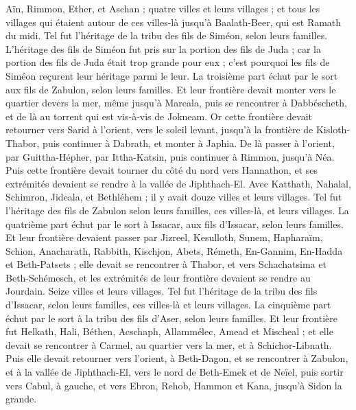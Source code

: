 \begin{multicols}{2}
Aïn, Rimmon, Ether, et Aschan ; quatre villes et leurs villages ;
et tous les villages qui étaient autour de ces villes-là jusqu'à Baalath-Beer, qui est Ramath du midi. Tel fut l'héritage de la tribu des fils de Siméon, selon leurs familles.
L'héritage des fils de Siméon fut pris sur la portion des fils de Juda ; car la portion des fils de Juda était trop grande pour eux ; c'est pourquoi les fils de Siméon reçurent leur héritage parmi le leur.
La troisième part échut par le sort aux fils de Zabulon, selon leurs familles.
Et leur frontière devait monter vers le quartier devers la mer, même jusqu'à Mareala, puis se rencontrer à Dabbéscheth, et de là au torrent qui est vis-à-vis de Jokneam.
Or cette frontière devait retourner vers Sarid à l'orient, vers le soleil levant, jusqu'à la frontière de Kisloth-Thabor, puis continuer à Dabrath, et monter à Japhia.
De là passer à l'orient, par Guittha-Hépher, par Ittha-Katsin, puis continuer à Rimmon, jusqu'à Néa.
Puis cette frontière devait tourner du côté du nord vers Hannathon, et ses extrémités devaient se rendre à la vallée de Jiphthach-El.
Avec Katthath, Nahalal, Schimron, Jideala, et Bethléhem ; il y avait douze villes et leurs villages.
Tel fut l'héritage des fils de Zabulon selon leurs familles, ces villes-là, et leurs villages.
La quatrième part échut par le sort à Issacar, aux fils d'Issacar, selon leurs familles.
Et leur frontière devaient passer par Jizreel, Kesulloth, Sunem,
Hapharaïm, Schion, Anacharath,
Rabbith, Kischjon, Abets,
Rémeth, En-Gannim, En-Hadda et Beth-Patsets ;
elle devait se rencontrer à Thabor, et vers Schachatsima et Beth-Schémesch, et les extrémités de leur frontière devaient se rendre au Jourdain. Seize villes et leurs villages.
Tel fut l'héritage de la tribu des fils d'Issacar, selon leurs familles, ces villes-là et leurs villages.
La cinquième part échut par le sort à la tribu des fils d'Aser, selon leurs familles.
Et leur frontière fut Helkath, Hali, Béthen, Acschaph,
Allammélec, Amead et Mischeal ; et elle devait se rencontrer à Carmel, au quartier vers la mer, et à Schichor-Libnath.
Puis elle devait retourner vers l'orient, à Beth-Dagon, et se rencontrer à Zabulon, et à la vallée de Jiphthach-El, vers le nord de Beth-Emek et de Neïel, puis sortir vers Cabul, à gauche,
et vers Ebron, Rehob, Hammon et Kana, jusqu'à Sidon la grande.

\end{multicols}
